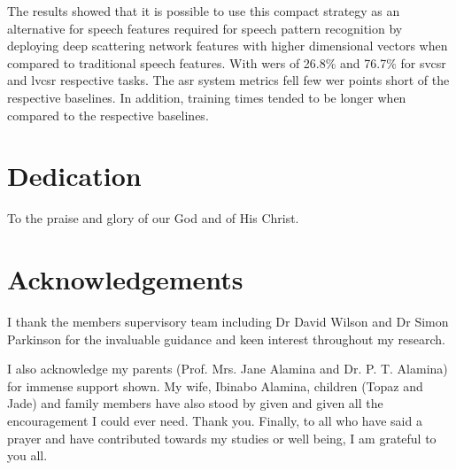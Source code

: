 \documentclass[12pt,twoside]{report}
\begin{document}
The results showed that it is possible to use this compact strategy as an alternative for speech features required for speech pattern recognition by deploying deep scattering network features with higher dimensional vectors when compared to traditional speech features. With \acrlong{wer}s of 26.8\% and 76.7\% for \acrshort{svcsr} and \acrshort{lvcsr} respective tasks. The \acrshort{asr} system metrics fell few \acrshort{wer} points short of the respective baselines.  In addition, training times tended to be longer when compared to the respective baselines.
\stopblue
{}


\chapter*{Dedication}
To the praise and glory of our God and of His Christ.

\chapter*{Acknowledgements}
I thank the members supervisory team including Dr David Wilson and Dr Simon Parkinson for the invaluable guidance and keen interest throughout my research.  

I also acknowledge my parents (Prof. Mrs. Jane Alamina and Dr. P. T. Alamina) for immense support shown.  My wife, Ibinabo Alamina, children (Topaz and Jade) and family members have also stood by given and given all the encouragement I could ever need.  Thank you.  Finally, to all who have said a prayer and have contributed towards my studies or well being, I am grateful to you all.

\end{document}
